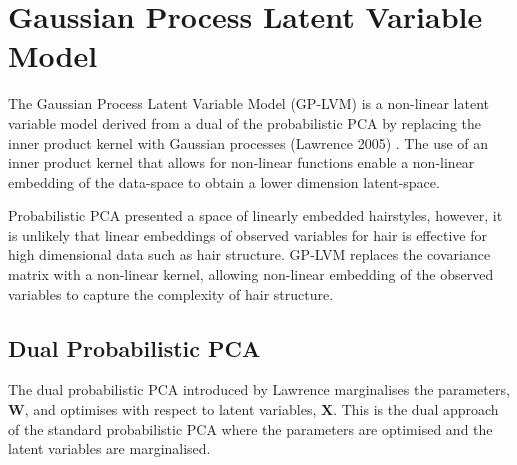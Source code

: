 \documentclass[ %
author={Dillon Keith Diep},
supervisor={Dr. Carl Henrik Ek},
degree={MEng},
title={ART-CG:},
subtitle={Assisted Real-time Content Generation of 3D Hair by Learning Manifolds},
type={Research},
year={2017} ]{dissertation}
\begin{document}
\section{Gaussian Process Latent Variable Model}
The Gaussian Process Latent Variable Model (GP-LVM) is a non-linear latent variable model derived from a dual of the probabilistic PCA by replacing the inner product kernel with Gaussian processes (Lawrence 2005) \cite{gplvm}. The use of an inner product kernel that allows for non-linear functions enable a non-linear embedding of the data-space to obtain a lower dimension latent-space. 

Probabilistic PCA presented a space of linearly embedded hairstyles, however, it is unlikely that linear embeddings of observed variables for hair is effective for high dimensional data such as hair structure. GP-LVM replaces the covariance matrix with a non-linear kernel, allowing non-linear embedding of the observed variables to capture the complexity of hair structure.
	
\subsection{Dual Probabilistic PCA}
The dual probabilistic PCA introduced by Lawrence marginalises the parameters, $\bm{W}$, and optimises with respect to latent variables, $\bm{X}$. This is the dual approach of the standard probabilistic PCA where the parameters are optimised and the latent variables are marginalised.
\end{document}
